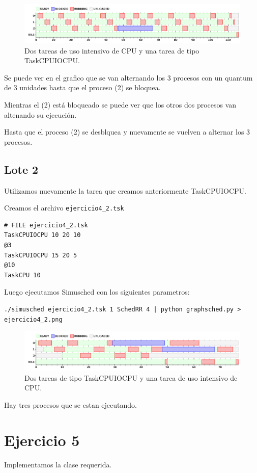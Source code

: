 \begin{figure}[h!]
  \caption{Dos tareas de uso intensivo de CPU y una tarea de tipo TaskCPUIOCPU.}
  \centering
    \includegraphics[width=1\textwidth]{img/ejercicio4_1.png}
\end{figure}

Se puede ver en el grafico que se van alternando los 3 procesos con un quantum de 3 unidades hasta que el proceso (2) se bloquea.

Mientras el (2) est\'a bloqueado se puede ver que los otros dos procesos van altenando su ejecuci\'on. 

Hasta que el proceso (2) se desblquea y nuevamente se vuelven a alternar los 3 procesos.

\subsection{Lote 2}

Utilizamos nuevamente la tarea que creamos anteriormente TaskCPUIOCPU.

Creamos el archivo \verb|ejercicio4_2.tsk|

\begin{framed}
\begin{verbatim}
# FILE ejercicio4_2.tsk
TaskCPUIOCPU 10 20 10
@3
TaskCPUIOCPU 15 20 5
@10
TaskCPU 10
\end{verbatim}
\end{framed}

Luego ejecutamos Simusched con los siguientes parametros:

\begin{framed}
\begin{verbatim}
./simusched ejercicio4_2.tsk 1 SchedRR 4 | python graphsched.py > ejercicio4_2.png
\end{verbatim}
\end{framed}

\begin{figure}[h!]
  \caption{Dos tareas de tipo TaskCPUIOCPU y una tarea de uso intensivo de CPU.}
  \centering
    \includegraphics[width=1\textwidth]{img/ejercicio4_2.png}
\end{figure}

Hay tres procesos que se estan ejecutando.

\section{Ejercicio 5}

Implementamos la clase requerida.

